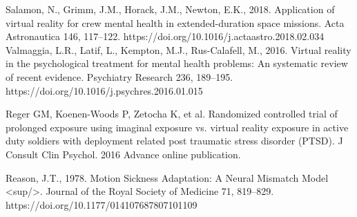 \documentclass[10pt,journal,compsoc]{IEEEtran}
\begin{document}
\begin{thebibliography}{1}
Salamon, N., Grimm, J.M., Horack, J.M., Newton, E.K., 2018. Application of virtual reality for crew mental health in extended-duration space missions. Acta Astronautica 146, 117–122. https://doi.org/10.1016/j.actaastro.2018.02.034\newline  
\bibitem {}
Valmaggia, L.R., Latif, L., Kempton, M.J., Rus-Calafell, M., 2016. Virtual reality in the psychological treatment for mental health problems: An systematic review of recent evidence. Psychiatry Research 236, 189–195. https://doi.org/10.1016/j.psychres.2016.01.015\newline
\bibitem {}

Reger GM, Koenen-Woods P, Zetocha K, et al. Randomized controlled trial of prolonged exposure using imaginal exposure vs. virtual reality exposure in active duty soldiers with deployment related post traumatic stress disorder (PTSD). J Consult Clin Psychol. 2016 Advance online publication.\newline 
\bibitem {}

Reason, J.T., 1978. Motion Sickness Adaptation: A Neural Mismatch Model <sup/>. Journal of the Royal Society of Medicine 71, 819–829. https://doi.org/10.1177/014107687807101109\newline


	\end{thebibliography}
	
\end{document}
